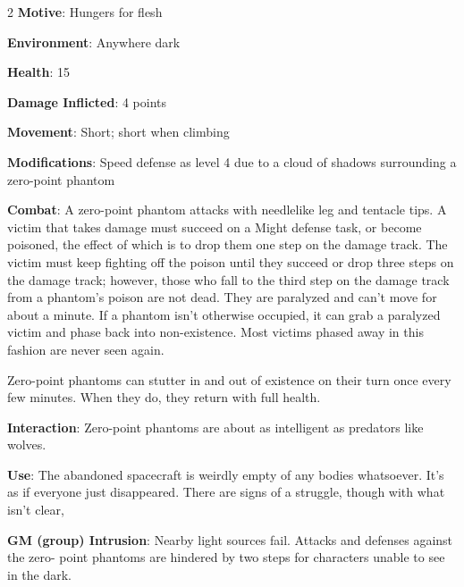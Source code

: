 \begin{multicols}{2}
\textbf{Motive}: Hungers for flesh 

\textbf{Environment}: Anywhere dark 

\textbf{Health}: 15 

\textbf{Damage Inflicted}: 4 points 

\textbf{Movement}: Short; short when climbing 

\textbf{Modifications}: Speed defense as level 4 due to a cloud of shadows surrounding a zero-point phantom 

\textbf{Combat}: A zero-point phantom attacks with needlelike leg and tentacle tips. A victim that takes damage must succeed on a Might defense task, or become poisoned, the effect of which is to drop them one step on the damage track. The victim must keep fighting off the poison until they succeed or drop three steps on the damage track; however, those who fall to the third step on the damage track from a phantom’s poison are not dead. They are paralyzed and can’t move for about a minute. If a phantom isn’t otherwise occupied, it can grab a paralyzed victim and phase back into non-existence. Most victims phased away in this fashion are never seen again. 

Zero-point phantoms can stutter in and out of existence on their turn once every few minutes. When they do, they return with full health. 

\textbf{Interaction}: Zero-point phantoms are about as intelligent as predators like wolves. 

\textbf{Use}: The abandoned spacecraft is weirdly empty of any bodies whatsoever. It’s as if everyone just disappeared. There are signs of a struggle, though with what isn’t clear,

\textbf{GM (group) Intrusion}: Nearby light sources fail. Attacks and defenses against the zero- point phantoms are hindered by two steps for characters unable to see in the dark.

\end{multicols}

\mydiv
